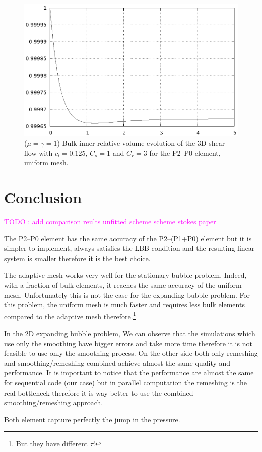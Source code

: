 \documentclass[a4paper,12pt,onecolumn]{article}
\begin{document}
\begin{figure}[htbp]
  \centering
  \includegraphics[width=.45\textwidth]{figures/3d_shear_bulk_inner_volume.ps}
  \caption{($\mu=\gamma=1$) Bulk inner relative volume evolution of the 3D shear flow with $c_l=0.125$, $C_s=1$ and $C_r=3$ for the P2--P0 element, uniform mesh.}
  \label{fig:shear_3d_bulk_inner_volume}
\end{figure}

\section{Conclusion}\label{sec:conclusion}
\textcolor{magenta}{TODO : add comparison reults unfitted scheme scheme stokes paper}

The P2--P0 element has the same accuracy of the P2--(P1+P0) element but it is simpler to implement, always satisfies the LBB condition and the resulting linear system is smaller therefore it is the best choice.

The adaptive mesh works very well for the stationary bubble problem. Indeed, with a fraction of bulk elements, it reaches the same accuracy of the uniform mesh. Unfortunately this is not the case for the expanding bubble problem. For this problem, the uniform mesh is much faster and requires less bulk elements compared to the adaptive mesh therefore.\footnote{But they have different $\tau$!}

In the 2D expanding bubble problem, We can observe that the simulations which use only the smoothing have bigger errors and take more time therefore it is not feasible to use only the smoothing process. On the other side both only remeshing and smoothing/remeshing combined achieve almost the same quality and performance. It is important to notice that the performance are almost the same for sequential code (our case) but in parallel computation the remeshing is the real bottleneck therefore it is way better to use the combined smoothing/remeshing approach.

Both element capture perfectly the jump in the pressure.
\newpage
 

\end{document}
